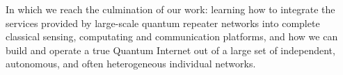 
\begin{partintro}
In which we reach the culmination of our work: learning how to integrate the services provided by large-scale quantum repeater networks into complete classical sensing, computating and communication platforms, and how we can build and operate a true Quantum Internet out of a large set of independent, autonomous, and often heterogeneous individual networks.
\end{partintro}
